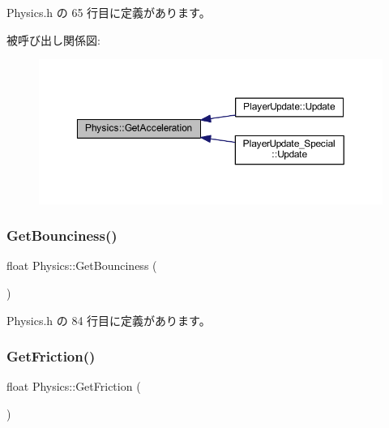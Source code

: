  Physics.\+h の 65 行目に定義があります。

被呼び出し関係図\+:\nopagebreak
\begin{figure}[H]
\begin{center}
\leavevmode
\includegraphics[width=350pt]{class_physics_aee9ce4604f63dbdcab07ded4d0174989_icgraph}
\end{center}
\end{figure}
\mbox{\label{class_physics_a5126745b31c45267ae516cc09a82fb5d}} 
\subsubsection{\texorpdfstring{Get\+Bounciness()}{GetBounciness()}}
{\footnotesize\ttfamily float Physics\+::\+Get\+Bounciness (\begin{DoxyParamCaption}{ }\end{DoxyParamCaption})\hspace{0.3cm}{\ttfamily [inline]}}



 Physics.\+h の 84 行目に定義があります。

\mbox{\label{class_physics_aee1fe26db953d0712b2a26ce9d1db0d9}} 
\subsubsection{\texorpdfstring{Get\+Friction()}{GetFriction()}}
{\footnotesize\ttfamily float Physics\+::\+Get\+Friction (\begin{DoxyParamCaption}{ }\end{DoxyParamCaption})\hspace{0.3cm}{\ttfamily [inline]}}



